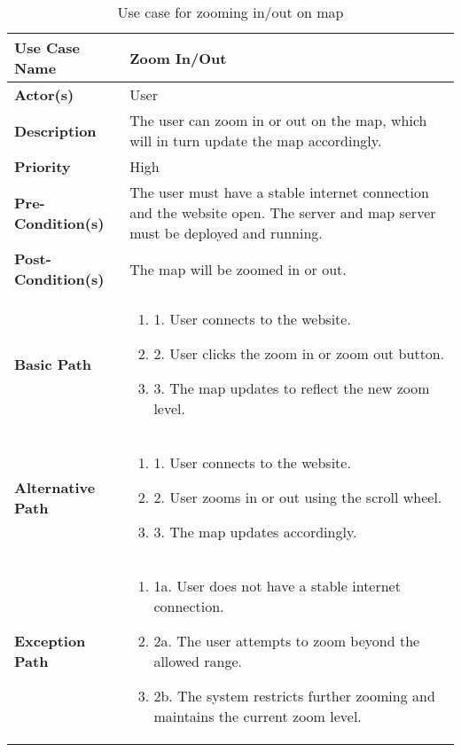 \begin{table}[h]
    \centering
    \renewcommand{\arraystretch}{1.5}
    \begin{tabularx}{\textwidth}{|l|X|}
        \hline
        \rowcolor{gray!20}
        \textbf{Use Case Name} & Zoom In/Out \\
        \hline
        \textbf{Actor(s)} & User \\
        \hline
        \textbf{Description} & The user can zoom in or out on the map, which will in turn update the map accordingly. \\
        \hline
        \textbf{Priority} & High \\
        \hline
        \textbf{Pre-Condition(s)} & The user must have a stable internet connection and the website open. The server and map server must be deployed and running. \\
        \hline
        \textbf{Post-Condition(s)} & The map will be zoomed in or out. \\
        \hline
        \textbf{Basic Path} &  
        \begin{enumerate}[label=,left=0pt]
            \item 1. User connects to the website.
            \item 2. User clicks the zoom in or zoom out button.
            \item 3. The map updates to reflect the new zoom level.
        \end{enumerate} \\
        \hline
        \textbf{Alternative Path} & 
        \begin{enumerate}[label=,left=0pt]
            \item 1. User connects to the website.
            \item 2. User zooms in or out using the scroll wheel.
            \item 3. The map updates accordingly.
        \end{enumerate} \\
        \hline
        \textbf{Exception Path} & 
        \begin{enumerate}[label=,left=0pt]
            \item 1a. User does not have a stable internet connection.
            \item 2a. The user attempts to zoom beyond the allowed range.
            \item 2b. The system restricts further zooming and maintains the current zoom level.
        \end{enumerate} \\
        \hline
    \end{tabularx}
    \caption*{Use case for zooming in/out on map}
    \label{tab:use_case_zoom_appendix}
\end{table}

